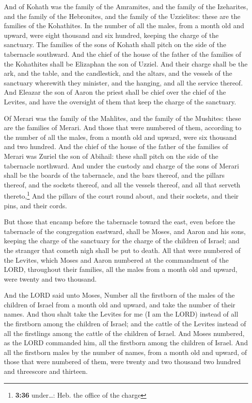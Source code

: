  And of Kohath was the family of the Amramites, and the
family of the Izeharites, and the family of the Hebronites, and the
family of the Uzzielites: these are the families of the Kohathites.
 In the number of all the males, from a month old and
upward, were eight thousand and six hundred, keeping the charge of the
sanctuary.  The families of the sons of Kohath shall
pitch on the side of the tabernacle southward.  And the
chief of the house of the father of the families of the Kohathites shall
be Elizaphan the son of Uzziel.  And their charge shall
be the ark, and the table, and the candlestick, and the altars, and the
vessels of the sanctuary wherewith they minister, and the hanging, and
all the service thereof.  And Eleazar the son of Aaron
the priest shall be chief over the chief of the Levites, and have the
oversight of them that keep the charge of the sanctuary.

 Of Merari was the family of the Mahlites, and the family
of the Mushites: these are the families of Merari.  And
those that were numbered of them, according to the number of all the
males, from a month old and upward, were six thousand and two hundred.
 And the chief of the house of the father of the families
of Merari was Zuriel the son of Abihail: these shall pitch on the side
of the tabernacle northward.  And under the custody and
charge of the sons of Merari shall be the boards of the tabernacle, and
the bars thereof, and the pillars thereof, and the sockets thereof, and
all the vessels thereof, and all that serveth thereto,\footnote{\textbf{3:36}
  under\ldots: Heb. the office of the charge}  And the
pillars of the court round about, and their sockets, and their pins, and
their cords.

 But those that encamp before the tabernacle toward the
east, even before the tabernacle of the congregation eastward, shall be
Moses, and Aaron and his sons, keeping the charge of the sanctuary for
the charge of the children of Israel; and the stranger that cometh nigh
shall be put to death.  All that were numbered of the
Levites, which Moses and Aaron numbered at the commandment of the LORD,
throughout their families, all the males from a month old and upward,
were twenty and two thousand.

 And the LORD said unto Moses, Number all the firstborn
of the males of the children of Israel from a month old and upward, and
take the number of their names.  And thou shalt take the
Levites for me (I am the LORD) instead of all the firstborn among the
children of Israel; and the cattle of the Levites instead of all the
firstlings among the cattle of the children of Israel. 
And Moses numbered, as the LORD commanded him, all the firstborn among
the children of Israel.  And all the firstborn males by
the number of names, from a month old and upward, of those that were
numbered of them, were twenty and two thousand two hundred and
threescore and thirteen.

